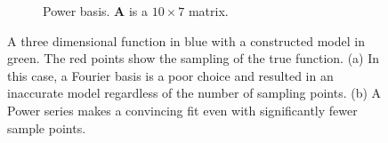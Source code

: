 \begin{figure}
\begin{subfigure}{0.8\textwidth}
    \caption{Power basis. $\mathbf{A}$ is a $10\times7$ matrix.} 
    \label{fig:3dPower}
  \end{subfigure}%
\caption{A three dimensional function in blue with a constructed model in green. The red points show the sampling of the true function. (a) In this case, a Fourier basis is a poor choice and resulted in an inaccurate model regardless of the number of sampling points. (b) A Power series makes a convincing fit even with significantly fewer sample points.} \label{fig:3dFit}
\end{figure}
